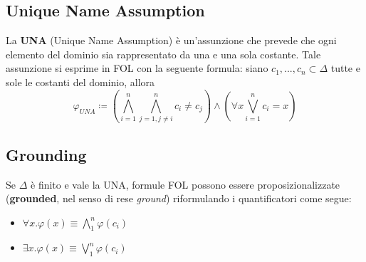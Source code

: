 \subsection{Unique Name Assumption}

La \textbf{UNA} (Unique Name Assumption) è un'assunzione che prevede che ogni elemento del dominio sia rappresentato da una e una sola costante. Tale assunzione si esprime in FOL con la seguente formula: siano ${c_1, ..., c_n} \subset \Delta$ tutte e sole le costanti del dominio, allora
$$ \varphi_{UNA} \coloneqq (\bigwedge\limits_{i=1}^n \bigwedge\limits_{j=1,j\neq i}^n c_i \neq c_j) \land (\forall x \bigvee\limits_{i = 1}^n c_i = x)$$

\subsection{Grounding}

Se $\Delta$ è finito e vale la UNA, formule FOL possono essere proposizionalizzate (\textbf{grounded}, nel senso di rese \textit{ground}) riformulando i quantificatori come segue:
\begin{itemize}
\item $\forall x . \varphi(x) \equiv \bigwedge\limits_1^n  \varphi(c_i) $
\item $\exists x . \varphi(x) \equiv \bigvee\limits_1^n  \varphi(c_i) $
\end{itemize}
